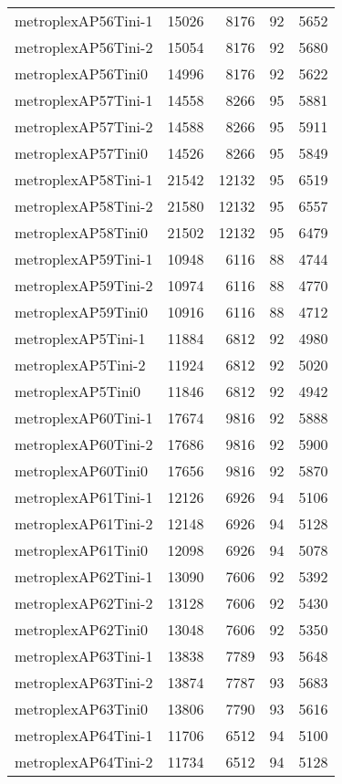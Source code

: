 \documentclass[../../../thesis.tex]{subfiles}
\begin{document}
\begin{longtable}{lrrrr}
metroplexAP56Tini-1 & 15026 & 8176 & 92 & 5652 \\
metroplexAP56Tini-2 & 15054 & 8176 & 92 & 5680 \\
metroplexAP56Tini0 & 14996 & 8176 & 92 & 5622 \\
metroplexAP57Tini-1 & 14558 & 8266 & 95 & 5881 \\
metroplexAP57Tini-2 & 14588 & 8266 & 95 & 5911 \\
metroplexAP57Tini0 & 14526 & 8266 & 95 & 5849 \\
metroplexAP58Tini-1 & 21542 & 12132 & 95 & 6519 \\
metroplexAP58Tini-2 & 21580 & 12132 & 95 & 6557 \\
metroplexAP58Tini0 & 21502 & 12132 & 95 & 6479 \\
metroplexAP59Tini-1 & 10948 & 6116 & 88 & 4744 \\
metroplexAP59Tini-2 & 10974 & 6116 & 88 & 4770 \\
metroplexAP59Tini0 & 10916 & 6116 & 88 & 4712 \\
metroplexAP5Tini-1 & 11884 & 6812 & 92 & 4980 \\
metroplexAP5Tini-2 & 11924 & 6812 & 92 & 5020 \\
metroplexAP5Tini0 & 11846 & 6812 & 92 & 4942 \\
metroplexAP60Tini-1 & 17674 & 9816 & 92 & 5888 \\
metroplexAP60Tini-2 & 17686 & 9816 & 92 & 5900 \\
metroplexAP60Tini0 & 17656 & 9816 & 92 & 5870 \\
metroplexAP61Tini-1 & 12126 & 6926 & 94 & 5106 \\
metroplexAP61Tini-2 & 12148 & 6926 & 94 & 5128 \\
metroplexAP61Tini0 & 12098 & 6926 & 94 & 5078 \\
metroplexAP62Tini-1 & 13090 & 7606 & 92 & 5392 \\
metroplexAP62Tini-2 & 13128 & 7606 & 92 & 5430 \\
metroplexAP62Tini0 & 13048 & 7606 & 92 & 5350 \\
metroplexAP63Tini-1 & 13838 & 7789 & 93 & 5648 \\
metroplexAP63Tini-2 & 13874 & 7787 & 93 & 5683 \\
metroplexAP63Tini0 & 13806 & 7790 & 93 & 5616 \\
metroplexAP64Tini-1 & 11706 & 6512 & 94 & 5100 \\
metroplexAP64Tini-2 & 11734 & 6512 & 94 & 5128 \\

\end{longtable}
\end{document}
